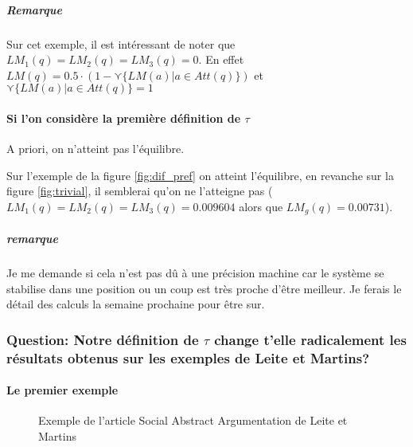 \documentclass[12pt]{article}
\theoremstyle{defi}
\theoremstyle{not}
\theoremstyle{prob}
\begin{document}
\subparagraph{Remarque\\}
Sur cet exemple, il est intéressant de noter que $LM_1(q) = LM_2(q) = LM_3(q) = 0$. En effet $LM(q) = 0.5 \cdot (1 - \curlyvee \{LM(a) | a\in Att(q)\})$ et $\curlyvee \{LM(a) | a\in Att(q)\} = 1$


\paragraph{Si l'on considère la première définition de $\tau$\\}
A priori, on n'atteint pas l'équilibre.

Sur l'exemple de la figure \ref{fig:dif_pref} on atteint l'équilibre, en revanche sur la figure \ref{fig:trivial}, il semblerai qu'on ne l'atteigne pas ($LM_1(q) = LM_2(q) = LM_3(q) = 0.009604$ alors que $LM_g(q) = 0.00731$).

\subparagraph{remarque\\} Je me demande si cela n'est pas dû à une précision machine car le système se stabilise dans une position ou un coup est très proche d'être meilleur. Je ferais le détail des calculs la semaine prochaine pour être sur.

\subsubsection{Question: Notre définition de $\tau$ change t'elle radicalement les résultats obtenus sur les exemples de Leite et Martins?}

\paragraph{Le premier exemple\\}

\begin{figure}
\centering
{}
\color{blue}
\caption{Exemple de l'article Social Abstract Argumentation de Leite et Martins}
\label{fig:LM_example}
\end{figure}
\end{document}
